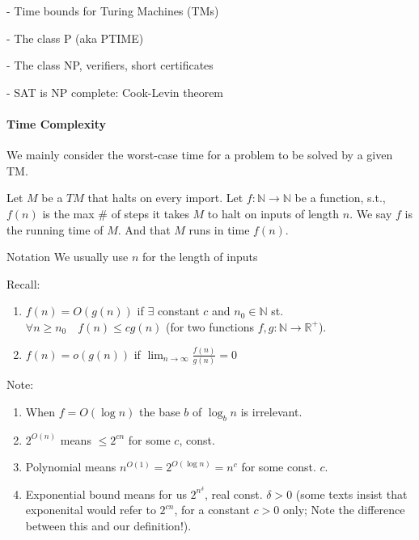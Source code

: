 - Time bounds for Turing Machines (TMs)

- The class P (aka PTIME)

- The class NP, verifiers, short certificates

- SAT is NP complete: Cook-Levin theorem



\paragraph{Time Complexity}
We mainly consider the worst-case time for a problem to be solved by a given TM.

\begin{definition}
    Let $M$ be a $T M$ that halts on every import. Let $f: \mathbb{N} \rightarrow \mathbb{N}$ be a function, s.t., $f(n)$ is the max \# of steps it takes $M$ to halt on inputs of length $n$. We say $f$ is the running time of $M$. And that $M$ runs in time $f(n)$.
\end{definition}

\begin{trailer}{Notation}
    We usually use $n$ for the length of inputs


Recall:
\begin{enumerate}
    \item 
 $f(n)=O(g(n))$ if $\exists$ constant $c$ and $n_0 \in \mathbb{N}$ st. $\forall n \geqslant n_0 \quad f(n) \leqslant c g(n) $ (for two functions  $f, g: \mathbb{N} \rightarrow \mathbb{R}^{+}$).

\item $f(n)=o(g(n))$ if $\lim _{n \rightarrow \infty} \frac{f(n)}{g(n)}=0$
\end{enumerate}
\end{trailer}


Note: 

\begin{enumerate}
    \item When $f=O\left(\log n\right)$ the base $b$ of $\log _b n$ is irrelevant.
    
    \item $2^{O(n)}$ means $\leqslant 2^{c n}$ for some $c$, const.

    \item Polynomial means $n^{O(1)}=2^{O\left(\log n\right)}=n^c$ for some const. $c$.
    \item Exponential bound means for us $2^{n^\delta}$, real const. $\delta>0$ (some texts insist that exponenital would refer to $2^{cn}$, for a constant $c>0$ only; Note the difference between this and our definition!).
\end{enumerate}
